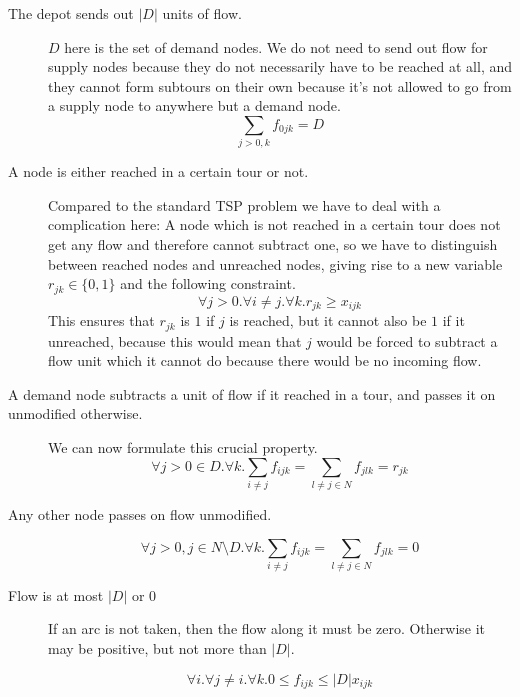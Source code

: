 \begin{description}
  \item[The depot sends out $|D|$ units of flow.] $D$ here is the set of demand nodes. We do 
  not need to send out flow for supply nodes because they do not necessarily have to be
  reached at all, and they cannot form subtours on their own because it's not allowed to 
  go from a supply node to anywhere but a demand node.
     \begin{equation}
       \sum_{j>0,k} f_{0jk} = D
     \end{equation}

  \item[A node is either reached in a certain tour or not.]
     Compared to the standard TSP problem we have to deal with a complication here: A node which 
     is not reached in a certain tour does not get any flow and therefore cannot subtract one,
     so we have to distinguish between reached nodes and unreached nodes, giving rise to a new
     variable $r_{jk} \in \{0,1\}$ and the following constraint.
     \begin{equation}
        \forall j>0. \forall i \neq j. \forall k. r_{jk} \geq x_{ijk}
     \end{equation}
     This ensures that $r_{jk}$ is $1$ if $j$ is reached, but it cannot also be $1$ if it unreached,
     because this would mean that $j$ would be forced to subtract a flow unit which it cannot
     do because there would be no incoming flow.

  \item[A demand node subtracts a unit of flow if it reached in a tour, and passes it on unmodified
        otherwise.] We can now formulate this crucial property.
  \begin{equation}
        \forall j>0 \in D. \forall k. \sum_{i \neq j} f_{ijk} = \sum_{l \neq j \in N} f_{jlk} = r_{jk}
  \end{equation}

  \item[Any other node passes on flow unmodified.]
  \begin{equation}
        \forall j>0, j \in N \setminus D. \forall k. \sum_{i \neq j} f_{ijk} = \sum_{l \neq j \in N} f_{jlk} = 0
  \end{equation}

  \item[Flow is at most $|D|$ or $0$] 

  If an arc is not taken, then the flow along it must be zero. Otherwise it may be positive, but 
  not more than $|D|$.

  \begin{equation}
        \forall i. \forall j \neq i. \forall k. 0 \leq f_{ijk} \leq |D| x_{ijk}
  \end{equation}
\end{description}

